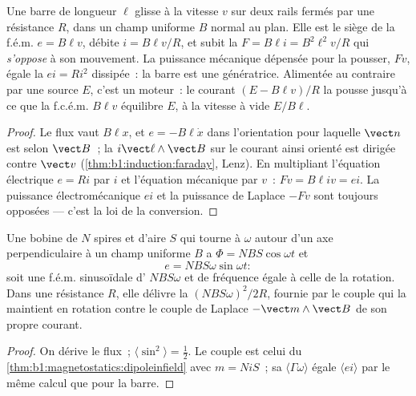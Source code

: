 \begin{proposition}\label{prop:b1:induction:rails}
Une barre de longueur $\ell$ glisse à la vitesse $v$ sur deux rails fermés par
une résistance $R$, dans un champ uniforme $B$ normal au plan. Elle est le
siège de la f.é.m. $e = B\ell v$, débite $i = B\ell v/R$, et subit la  $F = B\ell i = B^2\ell^2v/R$ qui \emph{s'oppose} à son mouvement.
La puissance mécanique dépensée pour la pousser, $Fv$, égale la  $ei = Ri^2$ dissipée~: la barre est une génératrice. Alimentée au
contraire par une source $E$, c'est un moteur~: le courant $(E - B\ell v)/R$ la
pousse jusqu'à ce que la f.c.é.m. $B\ell v$ équilibre $E$, à la vitesse à vide $E/B\ell$.
\end{proposition}

\begin{proof}
Le flux vaut $B\ell x$, et $e = -B\ell\dot x$ dans l'orientation pour laquelle $\vect n$ est
selon $\vect B$~; la  $i\vect\ell\wedge\vect B$ sur le courant
ainsi orienté est dirigée contre $\vect v$ (\cref{thm:b1:induction:faraday},
Lenz). En multipliant l'équation électrique $e = Ri$ par $i$ et l'équation
mécanique par $v$~: $Fv = B\ell iv = ei$. La puissance électromécanique
$ei$ et la puissance de Laplace $-Fv$ sont toujours opposées --- c'est la loi
de la conversion.
\end{proof}

\begin{proposition}\label{prop:b1:induction:alternator}
Une bobine de $N$ spires et d'aire $S$ qui tourne à $\omega$ autour d'un axe
perpendiculaire à un champ uniforme $B$ a $\Phi = NBS\cos\omega t$ et
\[
e = NBS\omega\sin\omega t :
\]
soit une f.é.m. sinusoïdale d' $NBS\omega$ et de fréquence égale à
celle de la rotation. Dans une résistance $R$, elle délivre la 
$(NBS\omega)^2/2R$, fournie par le couple qui la maintient en rotation contre le
couple de Laplace $-\vect m\wedge\vect B$ de son propre courant.
\end{proposition}

\begin{proof}
On dérive le flux~; $\langle\sin^2\rangle = \tfrac12$. Le couple est celui du
\cref{thm:b1:magnetostatics:dipoleinfield} avec $m = Ni S$~; sa  $\langle\Gamma\omega\rangle$ égale $\langle ei\rangle$ par le même
calcul que pour la barre.
\end{proof}


